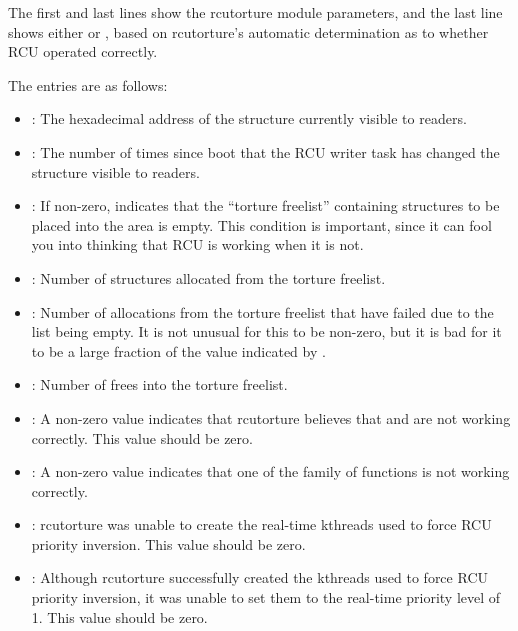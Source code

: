 The first and last lines show the rcutorture module parameters, and the
last line shows either  or , based on rcutorture's
automatic determination as to whether RCU operated correctly.

The entries are as follows:

\begin{itemize}
\item	{}: The hexadecimal address of the structure currently visible
	to readers.

\item	{}: The number of times since boot that the RCU writer task
	has changed the structure visible to readers.

\item	{}: If non-zero, indicates that the ``torture freelist''
	containing structures to be placed into the  area is empty.
	This condition is important, since it can fool you into thinking
	that RCU is working when it is not.%

\item	{}: Number of structures allocated from the torture freelist.

\item	{}: Number of allocations from the torture freelist that have
	failed due to the list being empty.
	It is not unusual for this
	to be non-zero, but it is bad for it to be a large fraction of
	the value indicated by .

\item	{}: Number of frees into the torture freelist.

\item	{}: A non-zero value indicates that rcutorture believes that
	 and  are not working
	correctly.
	This value should be zero.

\item	{}: A non-zero value indicates that one of the 
	family of functions is not working correctly.

\item	{}: rcutorture was unable to create the real-time kthreads
	used to force RCU priority inversion.
	This value should be zero.

\item	{}: Although rcutorture successfully created the kthreads
	used to force RCU priority inversion, it was unable to set them
	to the real-time priority level of 1.
	This value should be zero.


\end{itemize}
